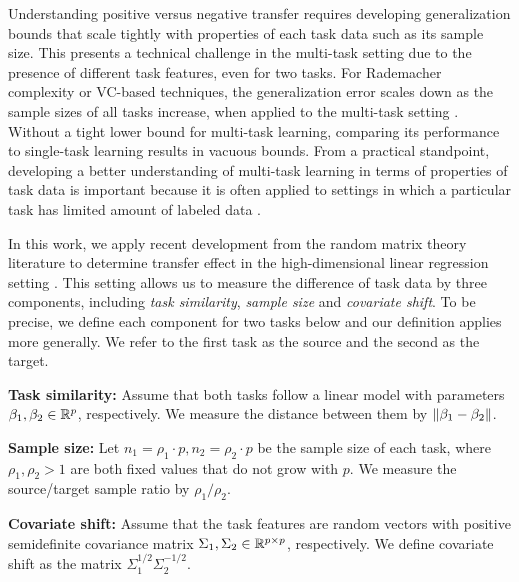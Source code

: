 Understanding positive versus negative transfer requires developing generalization bounds that scale tightly with properties of each task data such as its sample size.
This presents a technical challenge in the multi-task setting due to the presence of different task features, even for two tasks.
For Rademacher complexity or VC-based techniques, the generalization error scales down as the sample sizes of all tasks increase, when applied to the multi-task setting \cite{B00,AZ05,M06,MPR16,WZR20}.
Without a tight lower bound for multi-task learning, comparing its performance to single-task learning results in vacuous bounds.
From a practical standpoint, developing a better understanding of multi-task learning in terms of properties of task data is important because it is often applied to settings in which a particular task has limited amount of labeled data \cite{RH19}.


In this work, we apply recent development from the random matrix theory literature \cite{erdos2017dynamical,isotropic,Anisotropic} to determine transfer effect in the high-dimensional linear regression setting \cite{HMRT19,BLLT20}.
This setting allows us to measure the difference of task data by three components, including \textit{task similarity}, \textit{sample size} and \textit{covariate shift}.
To be precise, we define each component for two tasks below and our definition applies more generally.
We refer to the first task as the source and the second as the target.
\squishlist
	\item \textbf{Task similarity:} Assume that both tasks follow a linear model with parameters $\beta_1, \beta_2\in\mathbb{R}^p$, respectively.
	We measure the distance between them by $\|\beta_1 - \beta_2\|$.
	\item \textbf{Sample size:} Let $n_1 = \rho_1 \cdot p, n_2 = \rho_2 \cdot p$ be the sample size of each task, where $\rho_1, \rho_2>1$ are both fixed values that do not grow with $p$.
	We measure the source/target sample ratio by $\rho_1 / \rho_2$.
	\item \textbf{Covariate shift:} Assume that the task features are random vectors with positive semidefinite covariance matrix $\Sigma_1,\Sigma_2\in\mathbb{R}^{p\times p}$, respectively.
	We define covariate shift as the matrix $\Sigma_1^{1/2}\Sigma_2^{-1/2}$.
\squishend

